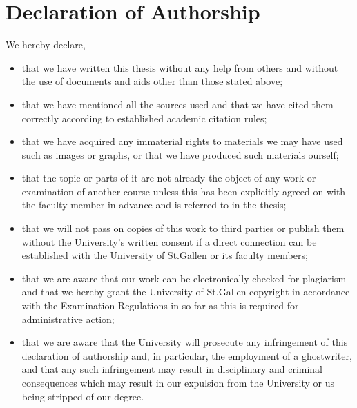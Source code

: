 \documentclass[a4paper,12pt]{article}
\begin{document}
\printbibliography
\clearpage

\section{Declaration of Authorship}
We hereby declare,
\begin{itemize}
    \item that we have written this thesis without any help from others and without the use of documents and aids other than those stated above;
    \item that we have mentioned all the sources used and that we have cited them correctly according to established academic citation rules;
    \item that we have acquired any immaterial rights to materials we may have used such as images or graphs, or that we have produced such materials ourself;
    \item that the topic or parts of it are not already the object of any work or examination of another course unless this has been explicitly agreed on with the faculty member in advance and is referred to in the thesis;
    \item that we will not pass on copies of this work to third parties or publish them without the University’s written consent if a direct connection can be established with the University of St.Gallen or its faculty members;
    \item that we are aware that our work can be electronically checked for plagiarism and that we hereby grant the University of St.Gallen copyright in accordance with the Examination Regulations in so far as this is required for administrative action;
    \item that we are aware that the University will prosecute any infringement of this declaration of authorship and, in particular, the employment of a ghostwriter, and that any such infringement may result in disciplinary and criminal consequences which may result in our expulsion from the University or us being stripped of our degree.
\end{itemize}
\end{document}
